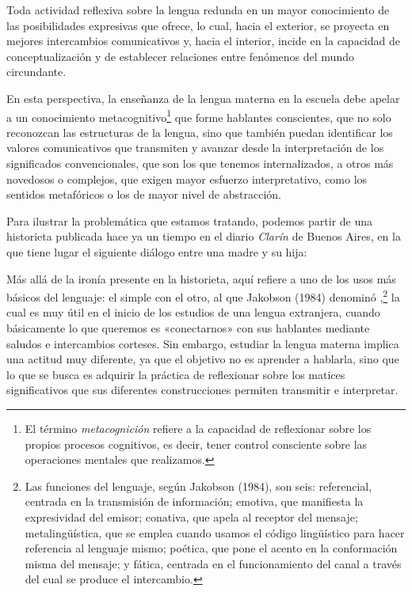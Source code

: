 \begin{recuadro}[Síntesis]
Toda actividad reflexiva sobre la lengua redunda en un mayor conocimiento de
las posibilidades expresivas que ofrece, lo cual, hacia el exterior, se
proyecta en mejores intercambios comunicativos y, hacia el interior, incide en
la capacidad de conceptualización y de establecer relaciones entre fenómenos
del mundo circundante.
\end{recuadro}

En esta perspectiva, la enseñanza de la lengua materna en la escuela debe
apelar a un conocimiento metacognitivo\footnote{El término
\textit{metacognición} \parencite{flavell1979} refiere a la capacidad de
reflexionar sobre los propios procesos cognitivos, es decir, tener control
consciente sobre las operaciones mentales que realizamos.} que forme hablantes
conscientes, que no solo reconozcan las estructuras de la lengua, sino que
también puedan identificar los valores comunicativos que transmiten y avanzar
desde la interpretación de los significados convencionales, que son los que
tenemos internalizados, a otros más novedosos o complejos, que exigen mayor
esfuerzo interpretativo, como los sentidos metafóricos o los de mayor nivel de
abstracción.

Para ilustrar la problemática que estamos tratando, podemos partir de una
historieta publicada hace ya un tiempo en el diario \textit{Clarín} de Buenos
Aires, en la que tiene lugar el siguiente diálogo entre una madre y su hija:


Más allá de la ironía presente en la historieta,  aquí
refiere a uno de los usos más básicos del lenguaje: el simple  con el otro, al que Jakobson (1984) denominó ,\footnote{Las funciones
del lenguaje, según Jakobson (1984), son seis: referencial, centrada en la
transmisión de información; emotiva, que manifiesta la expresividad del emisor;
conativa, que apela al receptor del mensaje; metalingüística, que se emplea
cuando usamos el código lingüístico para hacer referencia al lenguaje mismo;
poética, que pone el acento en la conformación misma del mensaje; y fática,
centrada en el funcionamiento del canal a través del cual se produce el
intercambio.} la cual es muy útil en el inicio de los estudios de una lengua
extranjera, cuando básicamente lo que queremos es «conectarnos» con sus
hablantes mediante saludos e intercambios corteses. Sin embargo, estudiar la
lengua materna implica una actitud muy diferente, ya que el objetivo no es
aprender a hablarla, sino que lo que se busca es adquirir la práctica de
reflexionar sobre los matices significativos que sus diferentes construcciones
permiten transmitir e interpretar.

